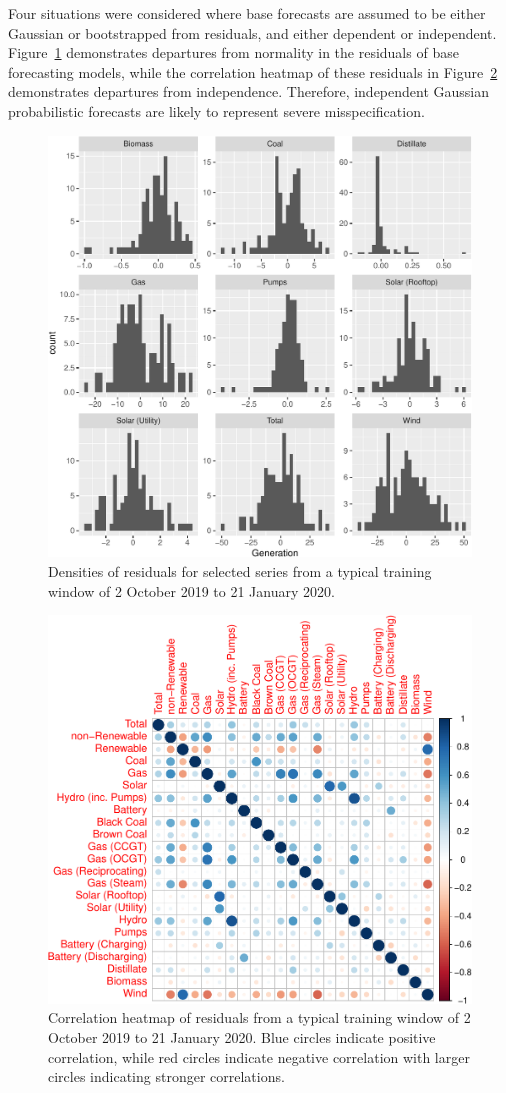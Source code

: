 \documentclass[a4paper,12pt]{article}
\theoremstyle{definition}
\begin{document}
Four situations were considered where base forecasts are assumed to be either Gaussian or bootstrapped from residuals, and either dependent or independent. Figure~\ref{fig:emp_hist} demonstrates departures from normality in the residuals of base forecasting models, while the correlation heatmap of these residuals in Figure~\ref{fig:emp_corr} demonstrates departures from independence. Therefore, independent Gaussian probabilistic forecasts are likely to represent severe misspecification.

\begin{figure}[!htb]
	\centering
	\includegraphics[width=.7\textwidth]{Figs/densities.pdf}
	\caption{Densities of residuals for selected series from a typical training window of 2 October 2019 to 21 January 2020.}
	\label{fig:emp_hist}
\end{figure}

\begin{figure}[!htb]
	\centering
	\includegraphics[width=.55\textwidth]{Figs/corr.pdf}
	\caption{Correlation heatmap of residuals from a typical training window of 2 October 2019 to 21 January 2020. Blue circles indicate positive correlation, while red circles indicate negative correlation with larger circles indicating stronger correlations.}
	\label{fig:emp_corr}
\end{figure}
\end{document}
